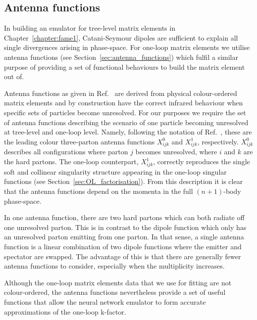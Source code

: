 \documentclass[main.tex]{subfiles}
\begin{document}
\subsection{Antenna functions}\label{sec:1L_antenna}
In building an emulator for tree-level matrix elements in Chapter~\ref{chapter:fame1},
Catani-Seymour dipoles \cite{Catani:1996vz} are sufficient
to explain all single divergences arising in phase-space. For
one-loop matrix elements we utilise antenna functions (see Section~\ref{sec:antenna_functions})
which fulfil a similar purpose of providing a set of functional behaviours
to build the matrix element out of.

Antenna functions as given in Ref.~\cite{Gehrmann-DeRidder:2005btv}
are derived from physical colour-ordered matrix elements and
by construction have the correct infrared behaviour when specific sets of
particles become unresolved. For our purposes we require the set of 
antenna functions describing the scenario of one particle
becoming unresolved at tree-level and one-loop level. Namely,
following the notation of Ref.~\cite{Gehrmann-DeRidder:2005btv},
these are the leading colour three-parton antenna functions
$X_{ijk}^{0}$ and $X_{ijk}^{1}$, respectively. $X_{ijk}^{0}$
describes all configurations where parton $j$ becomes unresolved,
where $i$ and $k$ are the hard partons. The one-loop counterpart,
$X_{ijk}^{1}$, correctly reproduces the single soft and collinear
singularity structure appearing in the one-loop singular functions
(see Section~\ref{sec:OL_factorisation}).
From this description it is clear that the antenna functions
depend on the momenta in the full $(n+1)$-body phase-space.

In one antenna function, there are two hard partons
which can both radiate off one unresolved parton. This is in
contrast to the dipole function which only has an unresolved
parton emitting from one parton. In that sense, a single antenna
function is a linear combination of two dipole functions where
the emitter and spectator are swapped. The advantage of this is
that there are generally fewer antenna functions to consider,
especially when the multiplicity increases.

Although the one-loop matrix elements data that we use for fitting are not
colour-ordered, the antenna functions nevertheless provide
a set of useful functions that allow the neural network emulator
to form accurate approximations of the one-loop k-factor.
\end{document}
